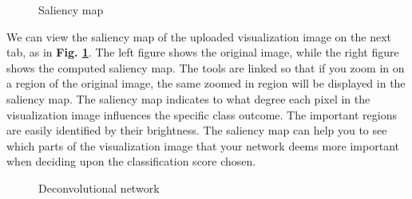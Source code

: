 
\begin{figure}[h!]
    \centering
        \caption{Saliency map}
        \label{saliency-tab}
\end{figure}

\noindent We can view the saliency map of the uploaded visualization image on the next tab, as in \textbf{Fig. \ref{saliency-tab}}. The left figure shows the original image, while the right figure shows the computed saliency map. The tools are linked so that if you zoom in on a region of the original image, the same zoomed in region will be displayed in the saliency map. The saliency map indicates to what degree each pixel in the visualization image influences the specific class outcome. The important regions are easily identified by their brightness. The saliency map can help you to see which parts of the visualization image that your network deems more important when deciding upon the classification score chosen.  \\

\begin{figure}[h!]
    \centering
        \caption{Deconvolutional network}
        \label{deconv-tab}
\end{figure}

